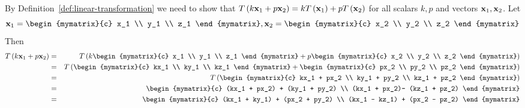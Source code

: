 \begin{solution}
  By Definition~\ref{def:linear-transformation} we need to show that $T\left(k \mbox{\bf x}_1 + p \mbox{\bf x}_2 \right) = kT\left(\mbox{\bf x}_1\right)+ pT\left(\mbox{\bf x}_{2} \right)$ for all scalars $k,p$ and vectors $\mbox{\bf x}_1, \mbox{\bf x}_2$.
  Let
  \[
    \vect{x}_1 = \begin{mymatrix}{c} x_1 \\ y_1 \\ z_1 \end{mymatrix}, 
    \vect{x}_2 = \begin{mymatrix}{c} x_2 \\ y_2 \\ z_2 \end{mymatrix}
  \]
  Then
  \begin{eqnarray*}
    T\tup{k \vect{x}_1 + p \vect{x}_2 } &=& T \tup{k \begin{mymatrix}{c} x_1 \\ y_1 \\ z_1 \end{mymatrix} + p \begin{mymatrix}{c} x_2 \\ y_2 \\ z_2 \end{mymatrix} } \\
                                        &=& T \tup{\begin{mymatrix}{c} kx_1 \\ ky_1 \\ kz_1 \end{mymatrix} +  \begin{mymatrix}{c} px_2 \\ py_2 \\ pz_2 \end{mymatrix} } \\
                                        &=& T \tup{\begin{mymatrix}{c} kx_1 + px_2 \\ ky_1 + py_2 \\ kz_1 + pz_2 \end{mymatrix}  } \\
                                        &=& \begin{mymatrix}{c} (kx_1 + px_2) + (ky_1 + py_2) \\ (kx_1 + px_2)- (kz_1 + pz_2) \end{mymatrix} \\
                                        &=& \begin{mymatrix}{c} (kx_1 + ky_1) + (px_2 + py_2) \\ (kx_1 - kz_1) + (px_2 - pz_2) \end{mymatrix} \\

\end{eqnarray*}
\end{solution}
